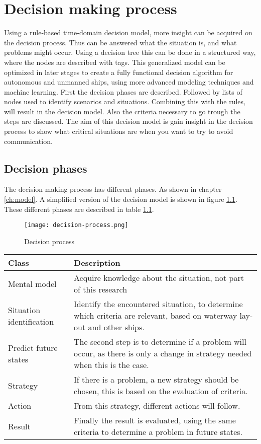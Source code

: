 \chapter{Decision making process}
\label{ch:decision-process}
Using a rule-based time-domain decision model, more insight can be acquired on the decision process. Thus can be answered what the situation is, and what problems might occur. Using a decision tree this can be done in a structured way, where the nodes are described with tags. This generalized model can be optimized in later stages to create a fully functional decision algorithm for autonomous and unmanned ships, using more advanced modeling techniques and machine learning. First the decision phases are described. Followed by lists of nodes used to identify scenarios and situations. Combining this with the rules, will result in the decision model. Also the criteria necessary to go trough the steps are discussed. The aim of this decision model is gain insight in the decision process to show what critical situations are when you want to try to avoid communication.

\section{Decision phases}
The decision making process has different phases. As shown in chapter \ref{ch:model}. A simplified version of the decision model is shown in figure \ref{fig:decision-process}. These different phases are described in table \ref{tab:phases-description}.

\begin{figure}[hb]
	\centering
	\texttt{[image: decision-process.png]}
	\caption{Decision process}
	\label{fig:decision-process}
\end{figure}

\begin{table}[H]
	\begin{tabular}{p{}|p{}}
		\toprule
		Class & Description\\
		\midrule
		Mental model & Acquire knowledge about the situation, not part of this research \\
		Situation identification & Identify the encountered situation, to determine which criteria are relevant, based on waterway lay-out and other ships. \\
		Predict future states & The second step is to determine if a problem will occur, as there is only a change in strategy needed when this is the case. \\
		Strategy & If there is a problem, a new strategy should be chosen, this is based on the evaluation of criteria. \\
		Action & From this strategy, different actions will follow. \\
		Result & Finally the result is evaluated, using the same criteria to determine a problem in future states. \\
		\bottomrule
	\end{tabular}
	
	\label{tab:phases-description}
\end{table}


